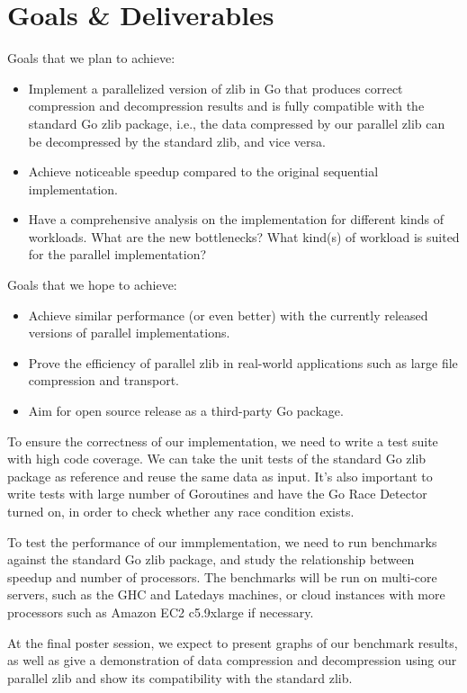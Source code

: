 \documentclass{article}
\begin{document}
\section{Goals \& Deliverables}
Goals that we plan to achieve:
\begin{itemize}
    \item Implement a parallelized version of zlib in Go that produces correct compression and decompression results and is fully compatible with the standard Go zlib package, i.e.,  the data compressed by our parallel zlib can be decompressed by the standard zlib, and vice versa.
    \item Achieve noticeable speedup compared to the original sequential implementation.
    \item Have a comprehensive analysis on the implementation for different kinds of workloads. What are the new bottlenecks? What kind(s) of workload is suited for the parallel implementation?
\end{itemize}

\noindent Goals that we hope to achieve:
\begin{itemize}
    \item Achieve similar performance (or even better) with the currently released versions of parallel implementations.
    \item Prove the efficiency of parallel zlib in real-world applications such as large file compression and transport.
    \item Aim for open source release as a third-party Go package.
\end{itemize}

\noindent To ensure the correctness of our implementation, we need to write a test suite with high code coverage. We can take the unit tests of the standard Go zlib package as reference and reuse the same data as input. It's also important to write tests with large number of Goroutines and have the Go Race Detector turned on, in order to check whether any race condition exists.

\noindent To test the performance of our immplementation, we need to run benchmarks against the standard Go zlib package, and study the relationship between speedup and number of processors. The benchmarks will be run on multi-core servers, such as the GHC and Latedays machines, or cloud instances with more processors such as Amazon EC2 c5.9xlarge if necessary.

\noindent At the final poster session, we expect to present graphs of our benchmark results, as well as give a demonstration of data compression and decompression using our parallel zlib and show its compatibility with the standard zlib.
\end{document}
